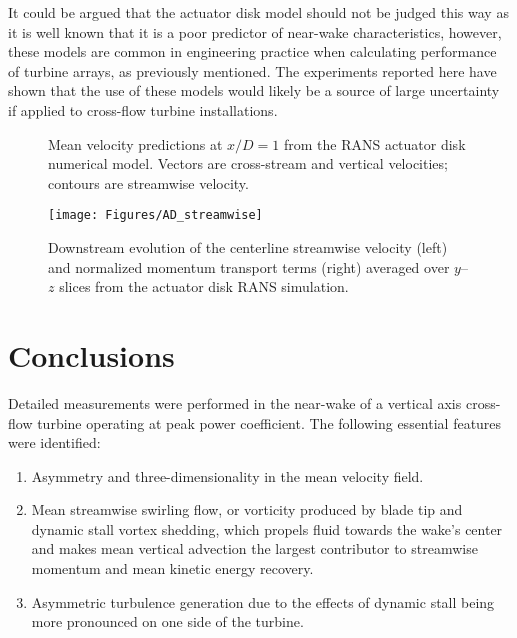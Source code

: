 It could be argued that the actuator disk model should not be judged this way as
it is well known that it is a poor predictor of near-wake characteristics,
however, these models are common in engineering practice when calculating
performance of turbine arrays, as previously mentioned. The experiments reported
here have shown that the use of these models would likely be a source of large
uncertainty if applied to cross-flow turbine installations.

\begin{figure}
    \centering
    \caption{Mean velocity predictions at $x/D=1$ from the RANS actuator disk 
        numerical model. Vectors are cross-stream and
        vertical velocities; contours are streamwise velocity.}
    \label{fig-AD_contours}
\end{figure}

\begin{figure}
    \centering 
    \texttt{[image: Figures/AD\_streamwise]}
    \caption{Downstream evolution of the centerline streamwise velocity (left) and
        normalized momentum transport terms (right) averaged over $y$--$z$ slices from  
        the actuator disk RANS simulation.}
    \label{fig-AD_streamwise}
\end{figure}

\section{Conclusions}

Detailed measurements were performed in the near-wake of a vertical axis
cross-flow turbine operating at peak power coefficient. The following essential
features were identified:

\begin{enumerate}
    \item Asymmetry and three-dimensionality in the mean velocity field. 
    
    \item Mean streamwise swirling flow, or vorticity produced by blade tip and
    dynamic stall vortex shedding, which propels fluid towards the wake's center
    and makes mean vertical advection the largest contributor to streamwise
    momentum and mean kinetic energy recovery.
    
    \item Asymmetric turbulence generation due to the effects of dynamic stall
    being more pronounced on one side of the turbine.
\end{enumerate}

